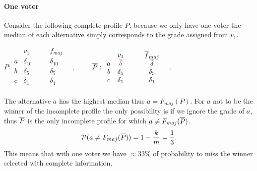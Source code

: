 \documentclass[version=3.21, pagesize, twoside=off, bibliography=totoc, DIV=calc, fontsize=12pt, a4paper]{scrartcl}
\begin{document}

\paragraph{One voter}
Consider the following complete profile $P$, because we only have one voter the median of each alternative simply corresponds to the grade assigned from $v_1$.
\begin{center}
	$P:
	\begin{array}{cccc}
		& v_1 & \quad & f_{maj} \\
		a &	\delta_{10} &\quad& \delta_{10} \\
		b &	\delta_5  &\quad& \delta_5 \\
		c &	\delta_1  &\quad& \delta_1 \\
	\end{array} \quad, \qquad
	$
	$\overline{P}:
	\begin{array}{cccc}
		& v_1 & \quad & \overline{f}_{maj} \\
		a &	{\color{red}\overline{\delta}} &\quad& \overline{\delta} \\
		b &	\delta_5  &\quad& \delta_5 \\
		c &	\delta_1  &\quad& \delta_1 \\
	\end{array} \quad.
	$
\end{center}

The alternative $a$ has the highest median thus $a=F_{maj}(P)$. For $a$ not to be the winner of the incomplete profile the only possibility is if we ignore the grade of $a$, thus $\overline{P}$ is the only incomplete profile for which $a\neq F_{maj}(\overline{P})$.
\[\mathcal{P}(a\neq F_{maj}(\overline{P}))=1-\frac{k}{m}=\frac{1}{3}.\]
This means that with one voter we have $\approx 33\%$ of probability to miss the winner selected with complete information.
\end{document}

